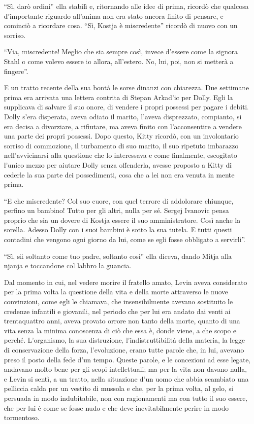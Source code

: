 ``Sì, darò ordini'' ella stabilì e, ritornando alle idee di prima, ricordò che qualcosa d'importante riguardo all'anima non era stato ancora finito di pensare, e cominciò a ricordare cosa. ``Sì, Kostja è miscredente'' ricordò di nuovo con un sorriso. 

``Via, miscredente! Meglio che sia sempre così, invece d'essere come la signora Stahl o come volevo essere io allora, all'estero. No, lui, poi, non si metterà a fingere''. 

E un tratto recente della sua bontà le sorse dinanzi con chiarezza. Due settimane prima era arrivata una lettera contrita di Stepan Arkad'ic per Dolly. Egli la supplicava di salvare il suo onore, di vendere i propri possessi per pagare i debiti. Dolly s'era disperata, aveva odiato il marito, l'aveva disprezzato, compianto, si era decisa a divorziare, a rifiutare, ma aveva finito con l'acconsentire a vendere una parte dei propri possessi. Dopo questo, Kitty ricordò, con un involontario sorriso di commozione, il turbamento di suo marito, il suo ripetuto imbarazzo nell'avvicinarsi alla questione che lo interessava e come finalmente, escogitato l'unico mezzo per aiutare Dolly senza offenderla, avesse proposto a Kitty di cederle la sua parte dei possedimenti, cosa che a lei non era venuta in mente prima. 

``E che miscredente? Col suo cuore, con quel terrore di addolorare chiunque, perfino un bambino! Tutto per gli altri, nulla per sé. Sergej Ivanovic pensa proprio che sia un dovere di Kostja essere il suo amministratore. Così anche la sorella. Adesso Dolly con i suoi bambini è sotto la sua tutela. E tutti questi contadini che vengono ogni giorno da lui, come se egli fosse obbligato a servirli''. 

``Sì, sii soltanto come tuo padre, soltanto così'' ella diceva, dando Mitja alla njanja e toccandone col labbro la guancia. 

Dal momento in cui, nel vedere morire il fratello amato, Levin aveva considerato per la prima volta la questione della vita e della morte attraverso le nuove convinzioni, come egli le chiamava, che insensibilmente avevano sostituito le credenze infantili e giovanili, nel periodo che per lui era andato dai venti ai trentaquattro anni, aveva provato orrore non tanto della morte, quanto di una vita senza la minima conoscenza di ciò che essa è, donde viene, a che scopo e perché. L'organismo, la sua distruzione, l'indistruttibilità della materia, la legge di conservazione della forza, l'evoluzione, erano tutte parole che, in lui, avevano preso il posto della fede d'un tempo. Queste parole, e le concezioni ad esse legate, andavano molto bene per gli scopi intellettuali; ma per la vita non davano nulla, e Levin si sentì, a un tratto, nella situazione d'un uomo che abbia scambiato una pelliccia calda per un vestito di mussola e che, per la prima volta, al gelo, si persuada in modo indubitabile, non con ragionamenti ma con tutto il suo essere, che per lui è come se fosse nudo e che deve inevitabilmente perire in modo tormentoso. 

